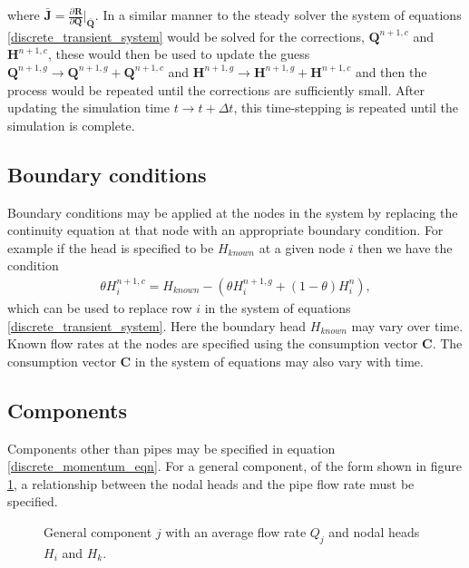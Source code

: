 \documentclass[12pt]{article}
\newcommand{\pardiv}[3]{\frac{\partial^{#1} #2}{\partial #3^{#1}}}
\begin{document}
where $\bar{\mathbf{J}} = \pardiv{}{\mathbf{R}}{\mathbf{Q}} \big\vert_{\bar{\mathbf{Q}}}$. In a similar manner to the steady solver the system of equations \eqref{discrete_transient_system} would be solved for the corrections, $\mathbf{Q}^{n+1,c}$ and $\mathbf{H}^{n+1,c}$, these would then be used to update the guess $\mathbf{Q}^{n+1,g} \rightarrow \mathbf{Q}^{n+1,g} + \mathbf{Q}^{n+1,c} $ and $\mathbf{H}^{n+1,g} \rightarrow \mathbf{H}^{n+1,g} + \mathbf{H}^{n+1,c} $ and then the process would be repeated until the corrections are sufficiently small. After updating the simulation time $t \rightarrow t + \Delta t$, this time-stepping is repeated until the simulation is complete.   

\subsection{Boundary conditions}

Boundary conditions may be applied at the nodes in the system by replacing the continuity equation at that node with an appropriate boundary condition. For example if the head is specified to be $H_{known}$ at a given node $i$ then we have the condition 
\begin{align}
\theta H_i^{n+1,c} = H_{known} - \left( \theta H_i^{n+1,g} + (1-\theta)H_i^n \right),
\end{align} 
which can be used to replace row $i$ in the system of equations \eqref{discrete_transient_system}. Here the boundary head $H_{known}$ may vary over time. Known flow rates at the nodes are specified using the consumption vector $\mathbf{C}$. The consumption vector $\mathbf{C}$ in the system of equations may also vary with time. 

\subsection{Components}

Components other than pipes may be specified in equation \eqref{discrete_momentum_eqn}. For a general component, of the form shown in figure \ref{fig:general_component}, a relationship between the nodal heads and the pipe flow rate must be specified. 

\begin{figure}
\centering
{} 
\caption{General component $j$ with an average flow rate $Q_j$ and nodal heads $H_i$ and $H_k$.}
\label{fig:general_component}
\end{figure}
\end{document}
